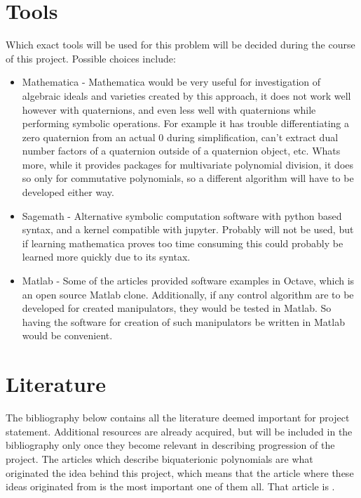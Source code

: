 \section{Tools}
Which exact tools will be used for this problem will be decided during the course of this project. Possible choices include:
\begin{itemize}
    \item Mathematica - Mathematica would be very useful for investigation of algebraic ideals and varieties created by this approach, it does not work well however with quaternions, and even less well with quaternions while performing symbolic operations. For example it has trouble differentiating a zero quaternion from an actual 0 during simplification, can't extract dual number factors of a quaternion outside of a quaternion object, etc. Whats more, while it provides packages for multivariate polynomial division, it does so only for commutative polynomials, so a different algorithm will have to be developed either way.
\item Sagemath - Alternative symbolic computation software with python based syntax, and a kernel compatible with jupyter. Probably will not be used, but if learning mathematica proves too time consuming this could probably be learned more quickly due to its syntax.
\item Matlab - Some of the articles provided software examples in Octave, which is an open source Matlab clone. Additionally, if any control algorithm are to be developed for created manipulators, they would be tested in Matlab. So having the software for creation of such manipulators be written in Matlab would be convenient. 

\end{itemize}

\section{Literature}
The bibliography below contains all the literature deemed important for project statement. Additional resources are already acquired, but will be included in the bibliography only once they become relevant in describing progression of the project. The articles which describe biquaterionic polynomials are what originated the idea behind this project, which means that the article where these ideas originated from is the most important one of them all. That article is \cite{Heged_s_2013}. 

